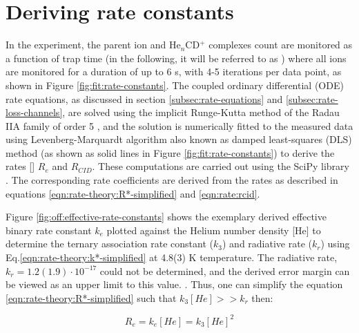 \section{Deriving rate constants}
\label{subsec:rate-constants}

In the experiment, the parent ion \CD and He$_n$CD$^+$ complexes count are
monitored as a function of trap time (in the following, it will be referred to
as ) where all ions are monitored for a duration of up to 6
s, with 4-5 iterations per data point, as shown in Figure
\ref{fig:fit:rate-constants}. The coupled ordinary differential (ODE) rate
equations, as discussed in section \ref{subsec:rate-equations} and
\ref{subsec:rate-loss-channels}, are solved using the implicit Runge-Kutta
method of the Radau IIA family of order 5 \cite{hairer_implementation_1996},
and the solution is numerically fitted to the measured data using
Levenberg-Marquardt algorithm also known as damped least-squares (DLS) method
(as shown as solid lines in Figure \ref{fig:fit:rate-constants}) to derive the
rates [\pers] $R_e$ and $R_{CID}$. These computations are carried out using the
SciPy library \cite{virtanen_scipy_2020}. The corresponding rate coefficients
are derived from the rates as described in equations
\ref{eqn:rate-theory:R*-simplified} and \ref{eqn:rate:rcid}.




Figure \ref{fig:off:effective-rate-constants} shows the exemplary derived
effective binary rate constant $k_e$ plotted against the Helium number density
    [He] to determine the ternary association rate constant ($k_3$) and radiative
rate ($k_r$) using Eq.\ref{eqn:rate-theory:k*-simplified} at 4.8(3) K
temperature. The radiative rate, $k_r=1.2(1.9) \cdot 10^{-17}$ could not be
determined, and the derived error margin can be viewed as an upper limit to
this value. . Thus, one can simplify the equation
\ref{eqn:rate-theory:R*-simplified} such that $k_3[He] >> k_r$ then:

\begin{equation}
    R_e = k_e[He] = k_3[He]^2
    \label{eqn:rate-theory:k*-further-simplified}
\end{equation}




